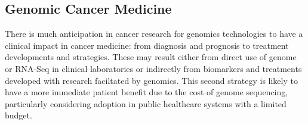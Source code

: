 



\subsection{Genomic Cancer Medicine}
There is much anticipation in cancer research for \gls{genomics} technologies to have a clinical impact in cancer medicine: from diagnosis and prognosis to treatment developments and strategies. These may result either from direct use of genome or \gls{RNA-Seq} in clinical laboratories or indirectly from biomarkers and treatments developed with research faciltated by \gls{genomics}. This second strategy is likely to have a more immediate patient benefit due to the cost of genome sequencing, particularly considering adoption in public healthcare systems with a limited budget.  

